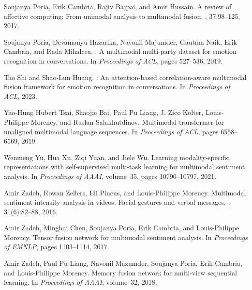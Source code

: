 \documentclass[11pt,twocolumn]{article}
\begin{document}
\begin{thebibliography}{}
Soujanya Poria, Erik Cambria, Rajiv Bajpai, and Amir Hussain.
\newblock A review of affective computing: From unimodal analysis to multimodal
  fusion.
, 37:98--125, 2017.

Soujanya Poria, Devamanyu Hazarika, Navonil Majumder, Gautam Naik, Erik
  Cambria, and Rada Mihalcea.
: A multimodal multi-party dataset for emotion recognition in
  conversations.
\newblock In {\em Proceedings of ACL}, pages 527--536, 2019.

Tao Shi and Shao-Lun Huang.
: An attention-based correlation-aware multimodal fusion
  framework for emotion recognition in conversations.
\newblock In {\em Proceedings of ACL}, 2023.

Yao-Hung Hubert Tsai, Shaojie Bai, Paul Pu Liang, J. Zico Kolter,
  Louis-Philippe Morency, and Ruslan Salakhutdinov.
\newblock Multimodal transformer for unaligned multimodal language sequences.
\newblock In {\em Proceedings of ACL}, pages 6558--6569, 2019.

Wenmeng Yu, Hua Xu, Ziqi Yuan, and Jiele Wu.
\newblock Learning modality-specific representations with self-supervised
  multi-task learning for multimodal sentiment analysis.
\newblock In {\em Proceedings of AAAI}, volume~35, pages 10790--10797, 2021.

Amir Zadeh, Rowan Zellers, Eli Pincus, and Louis-Philippe Morency.
\newblock Multimodal sentiment intensity analysis in videos: Facial gestures
  and verbal messages.
, 31(6):82--88, 2016.

Amir Zadeh, Minghai Chen, Soujanya Poria, Erik Cambria, and Louis-Philippe
  Morency.
\newblock Tensor fusion network for multimodal sentiment analysis.
\newblock In {\em Proceedings of EMNLP}, pages 1103--1114, 2017.

Amir Zadeh, Paul Pu Liang, Navonil Mazumder, Soujanya Poria, Erik Cambria, and
  Louis-Philippe Morency.
\newblock Memory fusion network for multi-view sequential learning.
\newblock In {\em Proceedings of AAAI}, volume~32, 2018.

\end{thebibliography}
\end{document}
